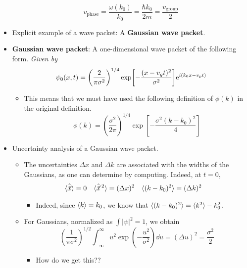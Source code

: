 \documentclass[../notes.tex]{subfiles}
\begin{document}
\begin{itemize}
    \begin{equation*}
        v_\text{phase} = \frac{\omega(k_0)}{k_0} = \frac{\hbar k_0}{2m} = \frac{v_\text{group}}{2}
    \end{equation*}
    \item Explicit example of a wave packet: A \textbf{Gaussian wave packet}.
    \item \textbf{Gaussian wave packet}: A one-dimensional wave packet of the following form. \emph{Given by}
    \begin{equation*}
        \psi_0(x,t) = \left( \frac{2}{\pi\sigma^2} \right)^{1/4}\exp[-\frac{(x-v_gt)^2}{\sigma^2}]\e[i(k_0x-v_pt)]
    \end{equation*}
    \begin{itemize}
        \item This means that we must have used the following definition of $\phi(k)$ in the original definition.
        \begin{equation*}
            \phi(k) = \left( \frac{\sigma^2}{2\pi} \right)^{1/4}\exp[-\frac{\sigma^2(k-k_0)^2}{4}]
        \end{equation*}
    \end{itemize}
    \item Uncertainty analysis of a Gaussian wave packet.
    \begin{itemize}
        \item The uncertainties $\Delta x$ and $\Delta k$ are associated with the widths of the Gaussians, as one can determine by computing. Indeed, at $t=0$,
        \begin{align*}
            \Exp{\hat{\vec{x}}} &= 0&
            \Exp{\hat{\vec{x}}{\,}^2} &= (\Delta x)^2&
            \Exp{(k-k_0)^2} &= (\Delta k)^2
        \end{align*}
        \begin{itemize}
            \item Indeed, since $\Exp{k}=k_0$, we know that $\Exp{(k-k_0)^2}=\Exp{k^2}-k_0^2$.
        \end{itemize}
        \item For Gaussians, normalized as $\int|\psi|^2=1$, we obtain
        \begin{equation*}
            \left( \frac{1}{\pi\sigma^2} \right)^{1/2}\int_{-\infty}^\infty u^2\exp(-\frac{u^2}{\sigma^2})\dd{u}
            = (\Delta u)^2
            = \frac{\sigma^2}{2}
        \end{equation*}
        \begin{itemize}
            \item How do we get this??

\end{itemize}
\end{itemize}
\end{itemize}
\end{document}
